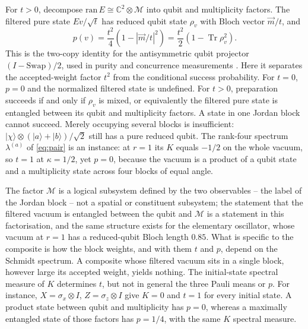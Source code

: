 \documentclass[11pt,a4paper]{article}
\newcommand{\Tr}{\operatorname{Tr}}
\newcommand{\ket}[1]{|#1\rangle}
\begin{document}
For $t>0$, decompose $\mathrm{ran}\,E\cong\mathbb C^2\otimes\mathcal M$ into qubit and multiplicity factors. The filtered pure state $Ev/\sqrt t$ has reduced qubit state $\rho_v$ with Bloch vector $\vec m/t$, and
\begin{equation}
p(v)=\frac{t^2}{4}\left(1-|\vec m/t|^2\right)
=\frac{t^2}{2}\left(1-\Tr\rho_v^2\right).
\label{eq:mixed}
\end{equation}
This is the two-copy identity for the antisymmetric qubit projector $(I-\mathrm{Swap})/2$, used in purity and concurrence measurements \cite{Walborn2007}. Here it separates the accepted-weight factor $t^2$ from the conditional success probability. For $t=0$, $p=0$ and the normalized filtered state is undefined. For $t>0$, preparation succeeds if and only if $\rho_v$ is mixed, or equivalently the filtered pure state is entangled between its qubit and multiplicity factors. A state in one Jordan block cannot succeed. Merely occupying several blocks is insufficient: $\ket\chi\otimes(\ket a+\ket b)/\sqrt2$ still has a pure reduced qubit. The rank-four spectrum $\lambda^{(a)}$ of \eqref{eq:pair} is an instance: at $r=1$ its $K$ equals $-1/2$ on the whole vacuum, so $t=1$ at $\kappa=1/2$, yet $p=0$, because the vacuum is a product of a qubit state and a multiplicity state across four blocks of equal angle.

The factor $\mathcal M$ is a logical subsystem defined by the two observables -- the label of the Jordan block -- not a spatial or constituent subsystem; the statement that the filtered vacuum is entangled between the qubit and $\mathcal M$ is a statement in this factorisation, and the same structure exists for the elementary oscillator, whose vacuum at $r=1$ has a reduced-qubit Bloch length $0.85$. What is specific to the composite is how the block weights, and with them $t$ and $p$, depend on the Schmidt spectrum. A composite whose filtered vacuum sits in a single block, however large its accepted weight, yields nothing. The initial-state spectral measure of $K$ determines $t$, but not in general the three Pauli means or $p$. For instance, $X=\sigma_x\otimes I$, $Z=\sigma_z\otimes I$ give $K=0$ and $t=1$ for every initial state. A product state between qubit and multiplicity has $p=0$, whereas a maximally entangled state of those factors has $p=1/4$, with the same $K$ spectral measure.
\end{document}

